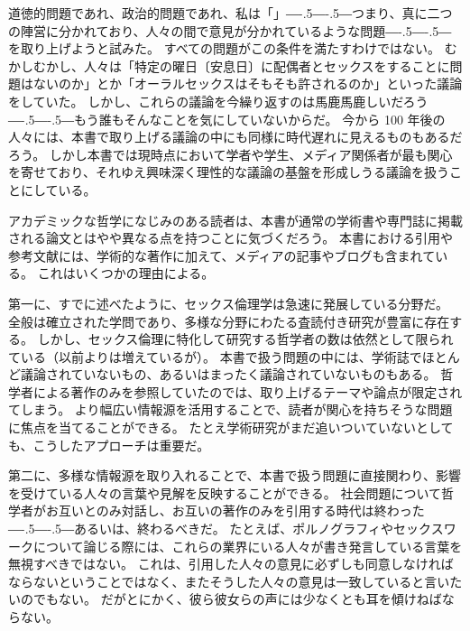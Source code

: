 \documentclass[paper=a4,book,openany]{jlreq}
\def\DDASH{―\kern-.5\zw―\kern-.5\zw―} %
\begin{document}
道徳的問題であれ、政治的問題であれ、私は「」{\DDASH}つまり、真に二つの陣営に分かれており、人々の間で意見が分かれているような問題{\DDASH}を取り上げようと試みた。
すべての問題がこの条件を満たすわけではない。
むかしむかし、人々は「特定の曜日〔安息日〕に配偶者とセックスをすることに問題はないのか」とか「オーラルセックスはそもそも許されるのか」といった議論をしていた。
しかし、これらの議論を今繰り返すのは馬鹿馬鹿しいだろう{\DDASH}もう誰もそんなことを気にしていないからだ。
今から 100 年後の人々には、本書で取り上げる議論の中にも同様に時代遅れに見えるものもあるだろう。
しかし本書では現時点において学者や学生、メディア関係者が最も関心を寄せており、それゆえ興味深く理性的な議論の基盤を形成しうる議論を扱うことにしている。

アカデミックな哲学になじみのある読者は、本書が通常の学術書や専門誌に掲載される論文とはやや異なる点を持つことに気づくだろう。
本書における引用や参考文献には、学術的な著作に加えて、メディアの記事やブログも含まれている。
これはいくつかの理由による。

第一に、すでに述べたように、セックス倫理学は急速に発展している分野だ。
全般は確立された学問であり、多様な分野にわたる査読付き研究が豊富に存在する。
しかし、セックス倫理に特化して研究する哲学者の数は依然として限られている（以前よりは増えているが）。
本書で扱う問題の中には、学術誌でほとんど議論されていないもの、あるいはまったく議論されていないものもある。
哲学者による著作のみを参照していたのでは、取り上げるテーマや論点が限定されてしまう。
より幅広い情報源を活用することで、読者が関心を持ちそうな問題に焦点を当てることができる。
たとえ学術研究がまだ追いついていないとしても、こうしたアプローチは重要だ。

第二に、多様な情報源を取り入れることで、本書で扱う問題に直接関わり、影響を受けている人々の言葉や見解を反映することができる。
社会問題について哲学者がお互いとのみ対話し、お互いの著作のみを引用する時代は終わった{\DDASH}あるいは、終わるべきだ。
たとえば、ポルノグラフィやセックスワークについて論じる際には、これらの業界にいる人々が書き発言している言葉を無視すべきではない。
これは、引用した人々の意見に必ずしも同意しなければならないということではなく、またそうした人々の意見は一致していると言いたいのでもない。
だがとにかく、彼ら彼女らの声には少なくとも耳を傾けねばならない。
\end{document}
